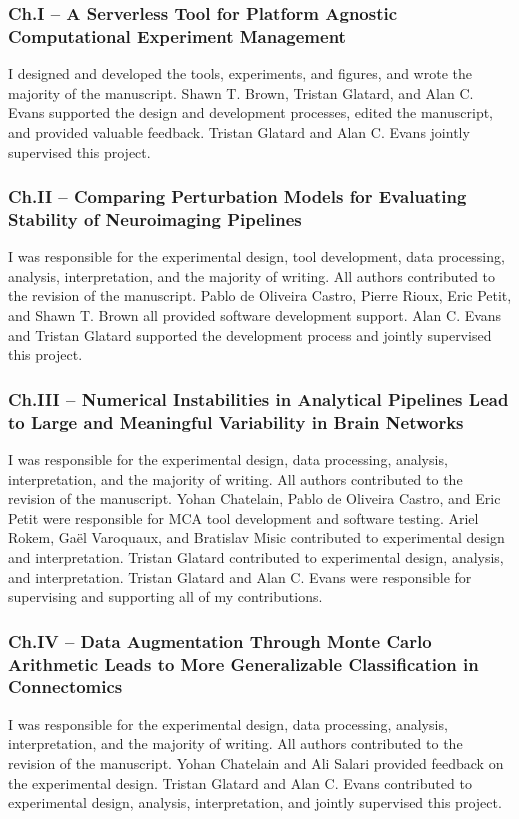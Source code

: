 \subsubsection*{Ch.I – A Serverless Tool for Platform Agnostic Computational Experiment Management}
I designed and developed the tools, experiments, and figures, and wrote the majority of the manuscript. Shawn T. Brown,
Tristan Glatard, and Alan C. Evans supported the design and development processes, edited the manuscript, and provided
valuable feedback. Tristan Glatard and Alan C. Evans jointly supervised this project.

\subsubsection*{Ch.II – Comparing Perturbation Models for Evaluating Stability of Neuroimaging Pipelines}
I was responsible for the experimental design, tool development, data processing, analysis, interpretation, and the
majority of writing. All authors contributed to the revision of the manuscript. Pablo de Oliveira Castro, Pierre Rioux,
Eric Petit, and Shawn T. Brown all provided software development support. Alan C. Evans and Tristan Glatard supported
the development process and jointly supervised this project.

\subsubsection*{Ch.III – Numerical Instabilities in Analytical Pipelines Lead to Large and Meaningful Variability in Brain
Networks}
I was responsible for the experimental design, data processing, analysis, interpretation, and the majority of writing.
All authors contributed to the revision of the manuscript. Yohan Chatelain, Pablo de Oliveira Castro, and Eric Petit
were responsible for MCA tool development and software testing. Ariel Rokem, Gaël Varoquaux, and Bratislav Misic
contributed to experimental design and interpretation. Tristan Glatard contributed to experimental design, analysis,
and interpretation. Tristan Glatard and Alan C. Evans were responsible for supervising and supporting all of my
contributions.

\subsubsection*{Ch.IV – Data Augmentation Through Monte Carlo Arithmetic Leads to More Generalizable Classification in
Connectomics}
I was responsible for the experimental design, data processing, analysis, interpretation, and the majority of writing.
All authors contributed to the revision of the manuscript. Yohan Chatelain and Ali Salari provided feedback on the
experimental design. Tristan Glatard and Alan C. Evans contributed to experimental design, analysis, interpretation,
and jointly supervised this project.

\clearpage
